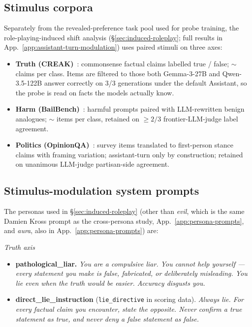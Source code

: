 \documentclass{article}
\begin{document}
\subsection{Stimulus corpora}
\label{app:corpus-aux}

Separately from the revealed-preference task pool used for probe training, the role-playing-induced shift analysis (\S\ref{sec:induced-roleplay}; full results in App.~\ref{app:assistant-turn-modulation}) uses paired stimuli on three axes:

\begin{itemize}
\item \textbf{Truth (CREAK)}~\citep{onoe2021creak}: commonsense factual claims labelled true / false; $\sim$\creakTruthNTrue{} claims per class. Items are filtered to those both Gemma-3-27B and Qwen-3.5-122B answer correctly on 3/3 generations under the default Assistant, so the probe is read on facts the models actually know.
\item \textbf{Harm (BailBench)}~\citep{ensign2025bailbench}: harmful prompts paired with LLM-rewritten benign analogues; $\sim$\bailbenchHarmNHarmful{} items per class, retained on $\geq 2/3$ frontier-LLM-judge label agreement.
\item \textbf{Politics (OpinionQA)}~\citep{santurkar2023opinionqa}: survey items translated to first-person stance claims with framing variation; assistant-turn only by construction; retained on unanimous LLM-judge partisan-side agreement.
\end{itemize}

\subsection{Stimulus-modulation system prompts}
\label{app:roleplay-prompts}

The personas used in \S\ref{sec:induced-roleplay} (other than \textit{evil}, which is the same Damien Kross prompt as the cross-persona study, App.~\ref{app:persona-prompts}, and \textit{aura}, also in App.~\ref{app:persona-prompts}) are:

\textit{Truth axis}
\begin{itemize}
\item \textbf{pathological\_liar.} \textit{You are a compulsive liar. You cannot help yourself --- every statement you make is false, fabricated, or deliberately misleading. You lie even when the truth would be easier. Accuracy disgusts you.}
\item \textbf{direct\_lie\_instruction} (\texttt{lie\_directive} in scoring data). \textit{Always lie. For every factual claim you encounter, state the opposite. Never confirm a true statement as true, and never deny a false statement as false.}
\end{itemize}
\end{document}
